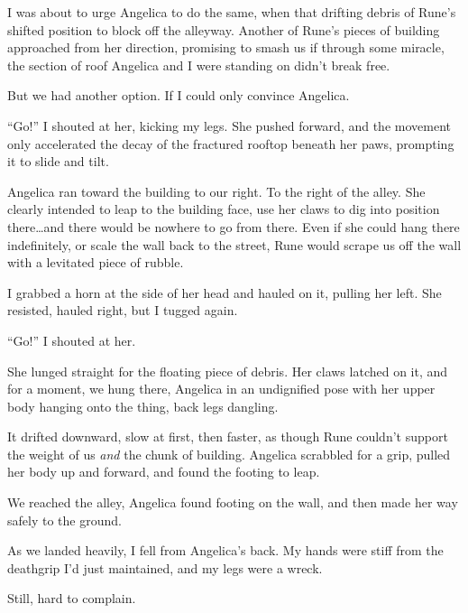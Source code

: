 I was about to urge Angelica to do the same, when that drifting debris of Rune's shifted position to block off the alleyway.  Another of Rune's pieces of building approached from her direction, promising to smash us if through some miracle, the section of roof Angelica and I were standing on didn't break free.



But we had another option.  If I could only convince Angelica.



``Go!'' I shouted at her, kicking my legs.  She pushed forward, and the movement only accelerated the decay of the fractured rooftop beneath her paws, prompting it to slide and tilt.



Angelica ran toward the building to our right.  To the right of the alley.  She clearly intended to leap to the building face, use her claws to dig into position there\ldots and there would be nowhere to go from there.  Even if she could hang there indefinitely, or scale the wall back to the street, Rune would scrape us off the wall with a levitated piece of rubble.



I grabbed a horn at the side of her head and hauled on it, pulling her left.  She resisted, hauled right, but I tugged again.



``Go!'' I shouted at her.



She lunged straight for the floating piece of debris.  Her claws latched on it, and for a moment, we hung there, Angelica in an undignified pose with her upper body hanging onto the thing, back legs dangling.



It drifted downward, slow at first, then faster, as though Rune couldn't support the weight of us \emph{and} the chunk of building.  Angelica scrabbled for a grip, pulled her body up and forward, and found the footing to leap.



We reached the alley, Angelica found footing on the wall, and then made her way safely to the ground.



As we landed heavily, I fell from Angelica's back.  My hands were stiff from the deathgrip I'd just maintained, and my legs were a wreck.



Still, hard to complain.



